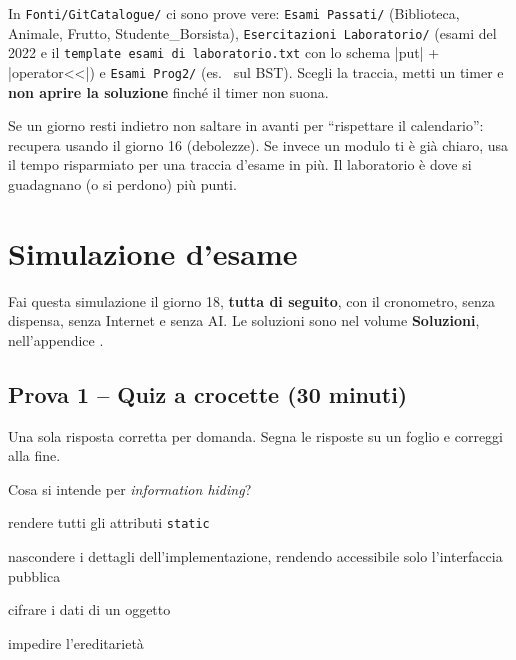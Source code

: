 \begin{consiglio}
In \texttt{Fonti/GitCatalogue/} ci sono prove vere: \texttt{Esami Passati/} (Biblioteca,
Animale, Frutto, Studente\_Borsista), \texttt{Esercitazioni Laboratorio/} (esami del 2022 e
il \texttt{template esami di laboratorio.txt} con lo schema \cc|put| + \cc|operator<<|) e
\texttt{Esami Prog2/} (es.\  sul BST). Scegli la traccia, metti un
timer e \textbf{non aprire la soluzione} finché il timer non suona.
\end{consiglio}

\begin{trappola}
Se un giorno resti indietro non saltare in avanti per ``rispettare il calendario'':
recupera usando il giorno 16 (debolezze). Se invece un modulo ti è già chiaro, usa il
tempo risparmiato per una traccia d'esame in più. Il laboratorio è dove si guadagnano
(o si perdono) più punti.
\end{trappola}

\section{Simulazione d'esame}

Fai questa simulazione il giorno 18, \textbf{tutta di seguito}, con il cronometro,
senza dispensa, senza Internet e senza AI. Le soluzioni sono nel volume
\textbf{Soluzioni}, nell'appendice .

\subsection*{Prova 1 -- Quiz a crocette (30 minuti)}

Una sola risposta corretta per domanda. Segna le risposte su un foglio e correggi alla fine.

\setcounter{domanda}{0}
\begin{quiz}{Cosa si intende per \emph{information hiding}?}
  \item rendere tutti gli attributi \texttt{static}
  \item nascondere i dettagli dell'implementazione, rendendo accessibile solo l'interfaccia pubblica
  \item cifrare i dati di un oggetto
  \item impedire l'ereditarietà
\end{quiz}

